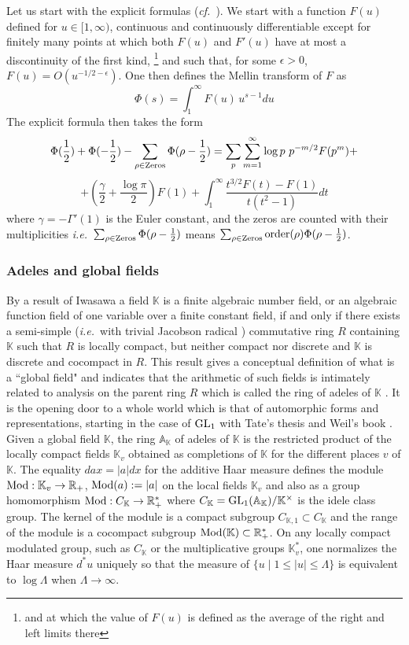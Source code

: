 \documentclass[12pt]{article}
\def\GL{{\rm GL}}
\def\mmod{{\rm Mod}}
\def\A{{\mathbb A}}
\def\K{{\mathbb K}}
\def\R{{\mathbb R}}
\newcommand{\ie}{{\it i.e.\/}\ }
\newcommand{\cff}{{\it cf.}~}
\def\rmz{{\rm Zeros}}
\begin{document}
Let us start with the explicit formulas (\cff \cite{weilpos0,weilpos, EB, patter}). We start with a
function
$F(u)$ defined for $u\in [1,\infty)$, continuous and continuously differentiable except for finitely many points at which both $F(u)$ and $F'(u)$ have at most a discontinuity of the first kind, \footnote{and at which the value of $F(u)$ is defined as the average of the right and left limits there} and such that, for some $\epsilon>0$, $F(u)=O(u^{-1/2-\epsilon})$. One then defines the Mellin transform of $F$ as 
\begin{equation}\label{expl}
\Phi(s)=\int_1^\infty F(u)\,u^{s-1}du
\end{equation}
The explicit formula then takes the form
\begin{equation}\label{explfor}
\Phi(\frac 12)+\Phi(-\frac 12)-\sum_{\rho\in \rmz}\Phi(\rho-\frac 12)=\sum_p\sum_{m=1}^\infty \log p \,\,p^{-m/2}F(p^m)+
\end{equation}
$$
+(\frac \gamma 2+\frac{\log\pi}{2})F(1)
+\int_1^\infty\frac{t^{3/2}F(t)-F(1)}{t(t^2-1)}dt
$$
where $\gamma=-\Gamma'(1)$ is the Euler constant, and  the zeros are counted with their multiplicities \ie $\sum_{\rho \in\rmz}\Phi(\rho-\frac 12)$ means $\sum_{\rho\in \rmz}{\rm order}(\rho)\Phi(\rho-\frac 12)$.


\subsubsection{Adeles and global fields}
By a result of Iwasawa \cite{Iwasawa} a field $\K$ is a finite algebraic number field, or an algebraic function field of one variable over a finite constant field, if and only if there exists 
 a semi-simple (\ie with trivial Jacobson radical \cite{Jac}) commutative ring $R$ containing $\K$ such that $R$ is locally compact, but neither compact nor discrete and  $\K$ is discrete and cocompact in $R$. This result gives a conceptual definition of what is a ``global field" and indicates that the arithmetic of such fields is intimately related to analysis on the parent ring $R$ which is called the ring of adeles of $\K$ \cite{Weil,tate}. It is the opening door to a whole world which is that of automorphic forms and representations, starting in the case of $\GL_1$ with Tate's thesis \cite{tate} and Weil's book \cite{Weil}. Given a global field $\K$, the ring  $\A_\K$ of adeles of $\K$  is the restricted product of the locally compact fields $\K_v$ obtained as completions of $\K$ for the different places $v$ of $\K$. The equality $dax=\vert a\vert dx$ for the additive Haar measure defines the module $\mmod:\K_v\to \R_+$, $\mmod(a):=\vert a\vert$  on the local fields $\K_v$ and also as a group homomorphism $\mmod:C_\K\to \R_+^*$ where $C_\K=\GL_1(\A_\K)/\K^\times$ is the idele class group. The kernel of the module is a compact subgroup $C_{\K,1}\subset C_\K$ and the range of the module is  a cocompact subgroup $\mmod(\K)\subset  \R_+^*$. On any locally compact modulated group, such as $C_\K$ or the multiplicative groups $\K_v^*$, one normalizes the Haar measure $d^*u$ uniquely so that the measure of $\{u\mid 1\leq \vert u\vert \leq \Lambda\}$ is equivalent to $\log \Lambda$ when $\Lambda\to \infty$.
\end{document}
